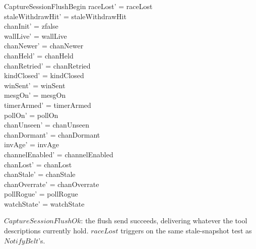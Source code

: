 \documentclass[a4paper,10pt,fleqn]{article}
\begin{document}
\begin{schema}{CaptureSessionFlushBegin}
  raceLost' = raceLost \\
  staleWithdrawHit' = staleWithdrawHit \\
  chanInit' = zfalse \\
  wallLive' = wallLive \\
  chanNewer' = chanNewer \\
  chanHeld' = chanHeld \\
  chanRetried' = chanRetried \\
  kindClosed' = kindClosed \\
  winSent' = winSent \\
  mesgOn' = mesgOn \\
  timerArmed' = timerArmed \\
  pollOn' = pollOn \\
  chanUnseen' = chanUnseen \\
  chanDormant' = chanDormant \\
  invAge' = invAge \\
  channelEnabled' = channelEnabled \\
  chanLost' = chanLost \\
  chanStale' = chanStale \\
  chanOverrate' = chanOverrate \\
  pollRogue' = pollRogue \\
  watchState' = watchState
\end{schema}

$CaptureSessionFlushOk$: the flush send succeeds, delivering whatever
the tool descriptions currently hold.  $raceLost$ triggers on the same
stale-snapshot test as $NotifyBelt$'s.
\end{document}
